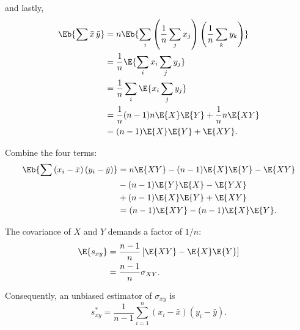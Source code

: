 \documentclass[compress]{beamer}\usepackage[]{graphicx}\usepackage[]{xcolor}
\begin{document}
\begin{frame}
    and lastly,
    \begin{equation*}
      \begin{aligned}
        \Eb{ \sum \bar{x} \, \bar{y} } &= n \Eb{ \sum_i \left( \frac{1}{n} \sum_j x_j \right) \left( \frac{1}{n} \sum_k y_k \right) } \\
          &= \frac{1}{n} \E{ \sum_i x_i \sum_j y_j } \\
          &= \frac{1}{n} \sum_i \E{ x_i \sum_j y_j } \\
          &= \frac{1}{n}(n-1)n\E{X}\E{Y} + \frac{1}{n}n\E{XY}\\
          &= (n-1)\E{X}\E{Y} + \E{XY}.
      \end{aligned}
    \end{equation*}

    Combine the four terms:
    \begin{equation*}
      \begin{aligned}
        \Eb{ \sum \left( x_i - \bar{x} \right) \left( y_i - \bar{y} \right) }
        &= n \E{XY} - (n-1)\E{X}\E{Y} - \E{XY} \\
        &- (n-1)\E{Y}\E{X} - \E{YX} \\
        &+ (n-1)\E{X}\E{Y} + \E{XY} \\
        &= (n-1)\E{XY} - (n-1)\E{X}\E{Y}.
      \end{aligned}
    \end{equation*}

    The covariance of $X$ and $Y$ demands a factor of $1/n$:
      \begin{equation*}
        \begin{aligned}
          \E{s_{xy}} &= \frac{n-1}{n} \left[ \E{XY} - \E{X}\E{Y} \right] \\
          &= \frac{n-1}{n} \sigma_{XY}.
          \end{aligned}
      \end{equation*}

    Consequently, an unbiased estimator of $\sigma_{xy}$ is
      \[ s_{xy}^* = \frac{1}{n-1} \sum_{i=1}^n \left( x_i - \bar{x} \right) \left( y_i - \bar{y} \right). \]
\end{frame}
\end{document}
